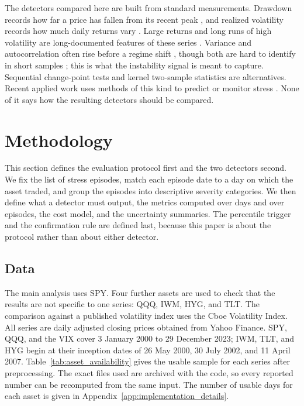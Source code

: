 \documentclass[pdflatex,sn-mathphys-num,iicol]{sn-jnl}
\begin{document}
The detectors compared here are built from standard measurements. Drawdown records how far a price has fallen from its recent peak \cite{magdon2004}, and realized volatility records how much daily returns vary \cite{andersen2003}. Large returns and long runs of high volatility are long-documented features of these series \cite{mandelbrot1963,cont2001,engle1982,bollerslev1986}. Variance and autocorrelation often rise before a regime shift \cite{scheffer2009,dakos2012}, though both are hard to identify in short samples \cite{boettiger2012}; this is what the instability signal is meant to capture. Sequential change-point tests \cite{page1954} and kernel two-sample statistics \cite{gretton2012} are alternatives. Recent applied work uses methods of this kind to predict or monitor stress \cite{gu2024,aldasoro2025,imf2026}. None of it says how the resulting detectors should be compared.

\section{Methodology}
\label{sec:method}
This section defines the evaluation protocol first and the two detectors second. We fix the list of stress episodes, match each episode date to a day on which the asset traded, and group the episodes into descriptive severity categories. We then define what a detector must output, the metrics computed over days and over episodes, the cost model, and the uncertainty summaries. The percentile trigger and the confirmation rule are defined last, because this paper is about the protocol rather than about either detector.

\subsection{Data}
The main analysis uses SPY. Four further assets are used to check that the results are not specific to one series: QQQ, IWM, HYG, and TLT. The comparison against a published volatility index uses the Cboe Volatility Index. All series are daily adjusted closing prices obtained from Yahoo Finance. SPY, QQQ, and the VIX cover 3 January 2000 to 29 December 2023; IWM, TLT, and HYG begin at their inception dates of 26 May 2000, 30 July 2002, and 11 April 2007. Table~\ref{tab:asset_availability} gives the usable sample for each series after preprocessing. The exact files used are archived with the code, so every reported number can be recomputed from the same input. The number of usable days for each asset is given in Appendix~\ref{app:implementation_details}.
\end{document}
